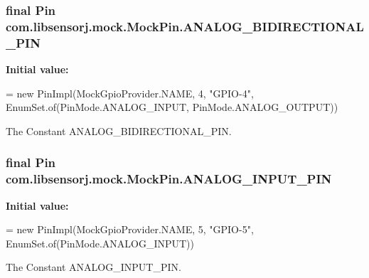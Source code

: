 \subsubsection[{A\+N\+A\+L\+O\+G\+\_\+\+B\+I\+D\+I\+R\+E\+C\+T\+I\+O\+N\+A\+L\+\_\+\+P\+I\+N}]{\setlength{\rightskip}{0pt plus 5cm}final Pin com.\+libsensorj.\+mock.\+Mock\+Pin.\+A\+N\+A\+L\+O\+G\+\_\+\+B\+I\+D\+I\+R\+E\+C\+T\+I\+O\+N\+A\+L\+\_\+\+P\+I\+N\hspace{0.3cm}{\ttfamily [static]}}\label{classcom_1_1libsensorj_1_1mock_1_1MockPin_a09976649e41290f5aa6c0d61fee67eda}
{\bfseries Initial value\+:}
\begin{DoxyCode}
= \textcolor{keyword}{new} PinImpl(MockGpioProvider.NAME, 4, \textcolor{stringliteral}{"GPIO-4"}, 
                                                                    EnumSet.of(PinMode.ANALOG\_INPUT, 
                                                                               PinMode.ANALOG\_OUTPUT))
\end{DoxyCode}
The Constant A\+N\+A\+L\+O\+G\+\_\+\+B\+I\+D\+I\+R\+E\+C\+T\+I\+O\+N\+A\+L\+\_\+\+P\+I\+N. \hypertarget{classcom_1_1libsensorj_1_1mock_1_1MockPin_a3ca873ea424dac948fabb4c2249ea0a3}{}
\subsubsection[{A\+N\+A\+L\+O\+G\+\_\+\+I\+N\+P\+U\+T\+\_\+\+P\+I\+N}]{\setlength{\rightskip}{0pt plus 5cm}final Pin com.\+libsensorj.\+mock.\+Mock\+Pin.\+A\+N\+A\+L\+O\+G\+\_\+\+I\+N\+P\+U\+T\+\_\+\+P\+I\+N\hspace{0.3cm}{\ttfamily [static]}}\label{classcom_1_1libsensorj_1_1mock_1_1MockPin_a3ca873ea424dac948fabb4c2249ea0a3}
{\bfseries Initial value\+:}
\begin{DoxyCode}
= \textcolor{keyword}{new} PinImpl(MockGpioProvider.NAME, 5, \textcolor{stringliteral}{"GPIO-5"}, 
                                                          EnumSet.of(PinMode.ANALOG\_INPUT))
\end{DoxyCode}
The Constant A\+N\+A\+L\+O\+G\+\_\+\+I\+N\+P\+U\+T\+\_\+\+P\+I\+N. \hypertarget{classcom_1_1libsensorj_1_1mock_1_1MockPin_ac0cb98f53fad4d229f1999253428e252}{}

